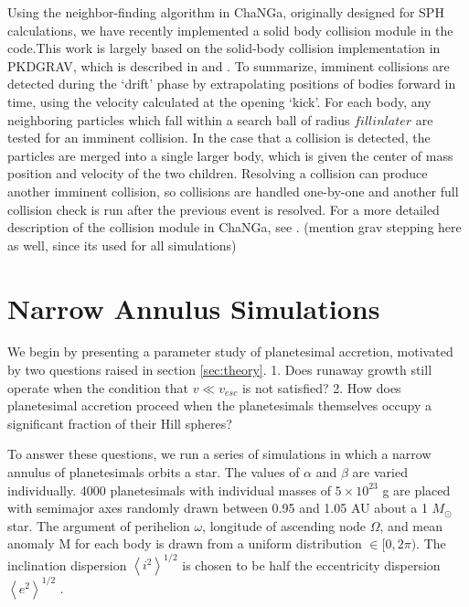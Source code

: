 \documentclass[twocolumn]{aastex63}
\begin{document}
Using the neighbor-finding algorithm in {\sc ChaNGa}, originally designed for SPH calculations, we have recently implemented a solid body collision module in the code.This work is largely based on the solid-body collision implementation in {\sc PKDGRAV}, which is described in \citet{richardson94} and \citet{richardson00}. To summarize, imminent collisions are detected during the `drift' phase by extrapolating positions of bodies forward in time, using the velocity calculated at the opening `kick'. For each body, any neighboring particles which fall within a search ball of radius $fill in later$ are tested for an imminent collision. In the case that a collision is detected, the particles are merged into a single larger body, which is given the center of mass position and velocity of the two children. Resolving a collision can produce another imminent collision, so collisions are handled one-by-one and another full collision check is run after the previous event is resolved. For a more detailed description of the collision module in {\sc ChaNGa}, see \citep{wallace19}. (mention grav stepping here as well, since its used for all simulations)

\section{Narrow Annulus Simulations}\label{sec:narrow}

We begin by presenting a parameter study of planetesimal accretion, motivated by two questions raised in section \ref{sec:theory}. 1. Does runaway growth still operate when the condition that $v \ll v_{esc}$ is not satisfied? 2. How does planetesimal accretion proceed when the planetesimals themselves occupy a significant fraction of their Hill spheres?

To answer these questions, we run a series of simulations in which a narrow annulus of planetesimals orbits a star. The values of $\alpha$ and $\beta$ are varied individually. 4000 planetesimals with individual masses of $5 \times 10^{23}$ g are placed with semimajor axes randomly drawn between 0.95 and 1.05 AU about a 1 $M_{\odot}$ star. The argument of perihelion $\omega$, longitude of ascending node $\Omega$, and mean anomaly M for each body is drawn from a uniform distribution $\in [0, 2 \pi)$. The inclination dispersion $\left< i^{2} \right>^{1/2}$ is chosen to be half the eccentricity dispersion $\left< e^{2} \right>^{1/2}$ \citep{ida93a}.
\end{document}
